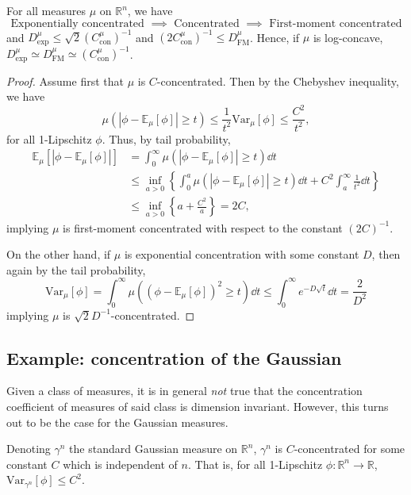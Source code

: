 \begin{proposition}\label{thm:equiv}
  For all measures \(\mu\) on \(\mathbb{R}^n\), we have 
  \[\text{Exponentially concentrated \(\implies\) Concentrated \(\implies\) First-moment concentrated}\]
  and \(D^\mu_{\text{exp}} \le \sqrt{2} (C^\mu_{\text{con}})^{-1}\) and 
  \((2C^\mu_{\text{con}})^{-1} \le D^\mu_{\text{FM}}\).
  Hence, if \(\mu\) is log-concave, 
  \(D^\mu_{\text{exp}} \simeq D^\mu_{\text{FM}} \simeq (C^\mu_{\text{con}})^{-1}\).
\end{proposition}
\begin{proof}
  Assume first that \(\mu\) is \(C\)-concentrated. Then by the Chebyshev inequality, we have 
  \[\mu(|\phi - \mathbb{E}_\mu[\phi]| \ge t) 
      \le \frac{1}{t^2}\text{Var}_\mu[\phi] 
      \le \frac{C^2}{t^2},\]
  for all 1-Lipschitz \(\phi\). 
  Thus, by tail probability,
  \begin{align*}\mathbb{E}_\mu[|\phi - \mathbb{E}_\mu[\phi]|] 
    & = \int_0^\infty \mu(|\phi - \mathbb{E}_\mu[\phi]| \ge t) \dd t\\ 
    & \le \inf_{a > 0} \left\{\int_0^a \mu(|\phi - \mathbb{E}_\mu[\phi]| \ge t) \dd t + C^2 \int_a^\infty \frac{1}{t^2} \dd t\right\}\\ 
    & \le \inf_{a > 0} \left\{a + \frac{C^2}{a}\right\} = 2C,
  \end{align*}
  implying \(\mu\) is first-moment concentrated with respect to the constant \((2C)^{-1}\).

  On the other hand, if \(\mu\) is exponential concentration with some constant \(D\), then 
  again by the tail probability, 
  \[\text{Var}_\mu[\phi] = \int_0^\infty \mu((\phi - \mathbb{E}_\mu[\phi])^2 \ge t) \dd t
      \le \int_0^\infty e^{-D \sqrt{t}} \dd t = \frac{2}{D^2}\]
  implying \(\mu\) is \(\sqrt{2} D^{-1}\)-concentrated.
\end{proof}

\subsection{Example: concentration of the Gaussian}

Given a class of measures, it is in general \textit{not} true that the concentration coefficient of 
measures of said class is dimension invariant. However, this turns out to be the case for the Gaussian 
measures.

\begin{theorem}\label{thm:gaussian_conc}
  Denoting \(\gamma^n\) the standard Gaussian measure on \(\mathbb{R}^n\), \(\gamma^n\) is \(C\)-concentrated 
  for some constant \(C\) which is independent of \(n\). That is, for all 1-Lipschitz 
  \(\phi : \mathbb{R}^n \to \mathbb{R}\), \(\text{Var}_{\gamma^n}[\phi] \le C^2\).
\end{theorem}

